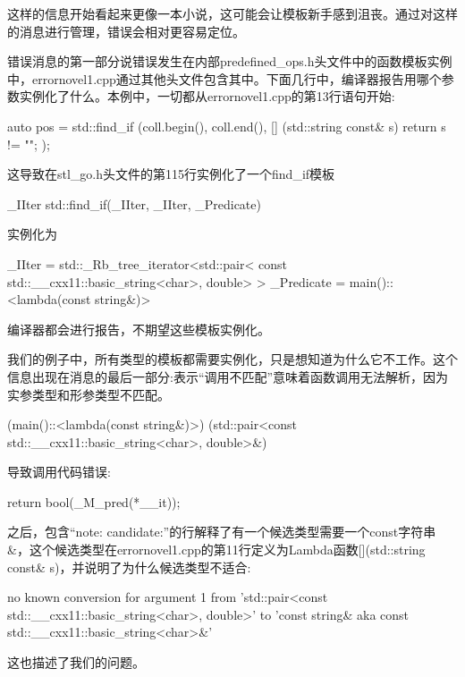 这样的信息开始看起来更像一本小说，这可能会让模板新手感到沮丧。通过对这样的消息进行管理，错误会相对更容易定位。

错误消息的第一部分说错误发生在内部predefined\_ops.h头文件中的函数模板实例中，errornovel1.cpp通过其他头文件包含其中。下面几行中，编译器报告用哪个参数实例化了什么。本例中，一切都从errornovel1.cpp的第13行语句开始:

\begin{cpp}
auto pos = 
std::find_if (coll.begin(), coll.end(),
	[] (std::string const& s) {
		return s != "";
	});
\end{cpp}

这导致在stl\_go.h头文件的第115行实例化了一个find\_if模板

\begin{cpp}
_IIter std::find_if(_IIter, _IIter, _Predicate)
\end{cpp}

实例化为

\begin{cpp}
_IIter = std::_Rb_tree_iterator<std::pair<
	const std::__cxx11::basic_string<char>, double> >
_Predicate = main()::<lambda(const string&)>
\end{cpp}

编译器都会进行报告，不期望这些模板实例化。

我们的例子中，所有类型的模板都需要实例化，只是想知道为什么它不工作。这个信息出现在消息的最后一部分:表示“调用不匹配”意味着函数调用无法解析，因为实参类型和形参类型不匹配。

\begin{cpp}
(main()::<lambda(const string&)>) (std::pair<const std::__cxx11::basic_string<char>, double>&)
\end{cpp}

导致调用代码错误:

\begin{cpp}
{ return bool(_M_pred(*__it)); }
\end{cpp}

之后，包含“note: candidate:”的行解释了有一个候选类型需要一个const字符串\&，这个候选类型在errornovel1.cpp的第11行定义为Lambda函数[](std::string const\& s)，并说明了为什么候选类型不适合:

{\scriptsize
\begin{shell}
no known conversion for argument 1
from ’std::pair<const std::__cxx11::basic_string<char>, double>’
to ’const string& {aka const std::__cxx11::basic_string<char>&}’
\end{shell}
}

这也描述了我们的问题。


